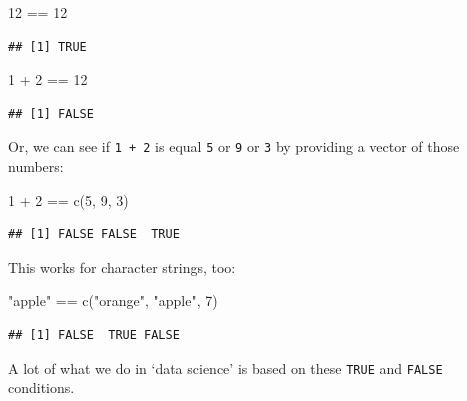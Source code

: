 \documentclass[
]{book}
\newenvironment{Shaded}{\begin{snugshade}}{\end{snugshade}}
\newcommand{\DecValTok}[1]{\textcolor[rgb]{0.00,0.00,0.81}{#1}}
\newcommand{\FunctionTok}[1]{\textcolor[rgb]{0.00,0.00,0.00}{#1}}
\newcommand{\NormalTok}[1]{#1}
\newcommand{\SpecialCharTok}[1]{\textcolor[rgb]{0.00,0.00,0.00}{#1}}
\newcommand{\StringTok}[1]{\textcolor[rgb]{0.31,0.60,0.02}{#1}}
\begin{document}
\begin{Shaded}
\begin{Highlighting}[]
\DecValTok{12} \SpecialCharTok{==} \DecValTok{12}
\end{Highlighting}
\end{Shaded}

\begin{verbatim}
## [1] TRUE
\end{verbatim}

\begin{Shaded}
\begin{Highlighting}[]
\DecValTok{1} \SpecialCharTok{+} \DecValTok{2} \SpecialCharTok{==} \DecValTok{12}
\end{Highlighting}
\end{Shaded}

\begin{verbatim}
## [1] FALSE
\end{verbatim}

Or, we can see if \texttt{1\ +\ 2} is equal \texttt{5} or \texttt{9} or \texttt{3} by providing a vector of those numbers:

\begin{Shaded}
\begin{Highlighting}[]
\DecValTok{1} \SpecialCharTok{+} \DecValTok{2} \SpecialCharTok{==} \FunctionTok{c}\NormalTok{(}\DecValTok{5}\NormalTok{, }\DecValTok{9}\NormalTok{, }\DecValTok{3}\NormalTok{)}
\end{Highlighting}
\end{Shaded}

\begin{verbatim}
## [1] FALSE FALSE  TRUE
\end{verbatim}

This works for character strings, too:

\begin{Shaded}
\begin{Highlighting}[]
\StringTok{"apple"} \SpecialCharTok{==} \FunctionTok{c}\NormalTok{(}\StringTok{"orange"}\NormalTok{, }\StringTok{"apple"}\NormalTok{, }\DecValTok{7}\NormalTok{)}
\end{Highlighting}
\end{Shaded}

\begin{verbatim}
## [1] FALSE  TRUE FALSE
\end{verbatim}

A lot of what we do in `data science' is based on these \texttt{TRUE} and \texttt{FALSE} conditions.
\end{document}
